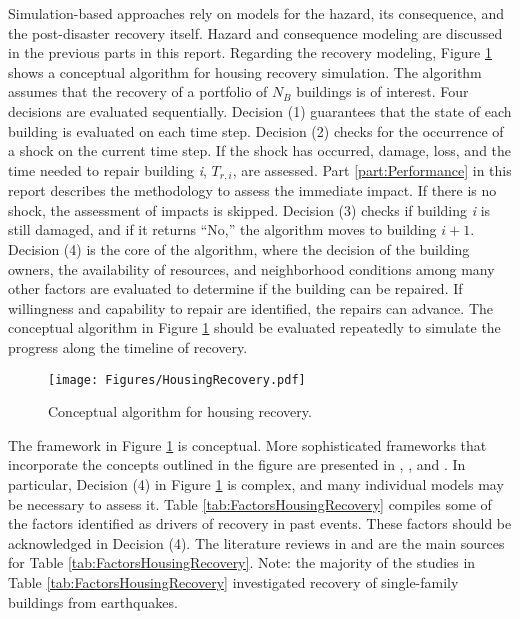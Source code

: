 Simulation-based approaches rely on models for the hazard, its consequence, and the post-disaster recovery itself. Hazard and consequence modeling are discussed in the previous parts in this report. Regarding the recovery modeling, Figure \ref{fig:HousingRecovery} shows a conceptual algorithm for housing recovery simulation. The algorithm assumes that the recovery of a portfolio of $N_B$ buildings is of interest. Four decisions are evaluated sequentially. Decision (1) guarantees that the state of each building is evaluated on each time step. Decision (2) checks for the occurrence of a shock on the current time step. If the shock has occurred, damage, loss, and the time needed to repair building \textit{i}, $T_{r,i}$, are assessed. Part \ref{part:Performance} in this report describes the methodology to assess the immediate impact. If there is no shock, the assessment of impacts is skipped. Decision (3) checks if building \textit{i} is still damaged, and if it returns ``No,'' the algorithm moves to building $i+1$. Decision (4) is the core of the algorithm, where the decision of the building owners, the availability of resources, and neighborhood conditions among many other factors are evaluated to determine if the building can be repaired. If willingness and capability to repair are identified, the repairs can advance. The conceptual algorithm in Figure \ref{fig:HousingRecovery} should be evaluated repeatedly to simulate the progress along the timeline of recovery.\ 

\begin{figure}[htb]
    \centering
    \texttt{[image: Figures/HousingRecovery.pdf]}
    \caption{Conceptual algorithm for housing recovery.}
    \label{fig:HousingRecovery}
\end{figure}

The framework in Figure \ref{fig:HousingRecovery} is conceptual. More sophisticated frameworks that incorporate the concepts outlined in the figure are presented in  \citet{Sutley2017a}, \citet{Burton2018}, and \citet{costa2020housing}. In particular, Decision (4) in Figure \ref{fig:HousingRecovery} is complex, and many individual models may be necessary to assess it. Table \ref{tab:FactorsHousingRecovery} compiles some of the factors identified as drivers of recovery in past events. These factors should be acknowledged in Decision (4). The literature reviews in \citet{Costa2019thesis} and \citet{moradi2020recovus} are the main sources for Table \ref{tab:FactorsHousingRecovery}. Note: the majority of the studies in Table \ref{tab:FactorsHousingRecovery} investigated recovery of single-family buildings from earthquakes. \ 


